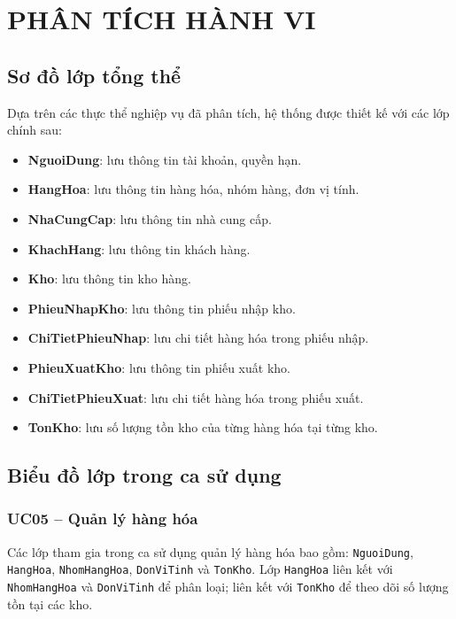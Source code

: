 \chapter{PHÂN TÍCH HÀNH VI}

\section{Sơ đồ lớp tổng thể}

Dựa trên các thực thể nghiệp vụ đã phân tích, hệ thống được thiết kế với các lớp chính sau:

\begin{itemize}[leftmargin=1.5cm]
    \item \textbf{NguoiDung}: lưu thông tin tài khoản, quyền hạn.
    \item \textbf{HangHoa}: lưu thông tin hàng hóa, nhóm hàng, đơn vị tính.
    \item \textbf{NhaCungCap}: lưu thông tin nhà cung cấp.
    \item \textbf{KhachHang}: lưu thông tin khách hàng.
    \item \textbf{Kho}: lưu thông tin kho hàng.
    \item \textbf{PhieuNhapKho}: lưu thông tin phiếu nhập kho.
    \item \textbf{ChiTietPhieuNhap}: lưu chi tiết hàng hóa trong phiếu nhập.
    \item \textbf{PhieuXuatKho}: lưu thông tin phiếu xuất kho.
    \item \textbf{ChiTietPhieuXuat}: lưu chi tiết hàng hóa trong phiếu xuất.
    \item \textbf{TonKho}: lưu số lượng tồn kho của từng hàng hóa tại từng kho.
\end{itemize}



\section{Biểu đồ lớp trong ca sử dụng}

\subsection{UC05 -- Quản lý hàng hóa}

Các lớp tham gia trong ca sử dụng quản lý hàng hóa bao gồm: \texttt{NguoiDung}, \texttt{HangHoa}, \texttt{NhomHangHoa}, \texttt{DonViTinh} và \texttt{TonKho}. Lớp \texttt{HangHoa} liên kết với \texttt{NhomHangHoa} và \texttt{DonViTinh} để phân loại; liên kết với \texttt{TonKho} để theo dõi số lượng tồn tại các kho.

